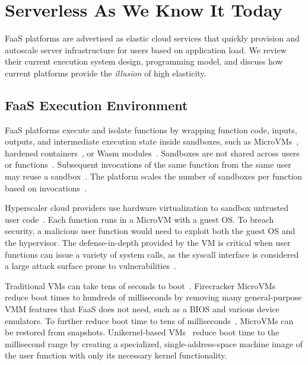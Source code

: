 \section{Serverless As We Know It Today}\label{sec:background}

FaaS platforms are advertised as elastic cloud services that quickly provision and autoscale server infrastructure for users based on application load. We review their current execution system design, programming model, and discuss how current platforms provide the \textit{illusion} of high elasticity.

\subsection{FaaS Execution Environment} %
FaaS platforms execute and isolate functions by wrapping function code, inputs, outputs, and intermediate execution state inside sandboxes, such as MicroVMs~\cite{firecracker}, hardened containers~\cite{gvisor}, or Wasm modules~\cite{wasm}. Sandboxes are not shared across users or functions~\cite{aws-lambda-exec-environment}. Subsequent invocations of the same function from the same user may reuse a sandbox~\cite{alzayat2023groundhog}. The platform scales the number of sandboxes per function based on invocations~\cite{knative, serverless-in-the-wild}. 


Hyperscaler cloud providers use hardware virtualization to sandbox untrusted user code~\cite{nitro, firecracker, azure-security}.
Each function runs in a MicroVM with a guest OS. To breach security, a malicious user function would need to exploit both the guest OS and the hypervisor. The defense-in-depth provided by the VM is critical when user functions can issue a variety of system calls, as the syscall interface is considered a large attack surface prone to vulnerabilities~\cite{linux-kernel-vulnerabilities, kernel-security}. 

Traditional VMs can take tens of seconds to boot~\cite{boxer-elasticity}. Firecracker MicroVMs~\cite{firecracker} reduce boot times to hundreds of milliseconds by removing many general-purpose VMM features that FaaS does not need, such as a BIOS and various device emulators. To further reduce boot time to tens of milliseconds~\cite{catalyzer, reap}, MicroVMs can be restored from snapshots. Unikernel-based VMs~\cite{seuss, unikraft, hand:unikernels, lightvm} reduce boot time to the millisecond range by creating a specialized, single-address-space machine image of the user function with only its necessary kernel functionality.

